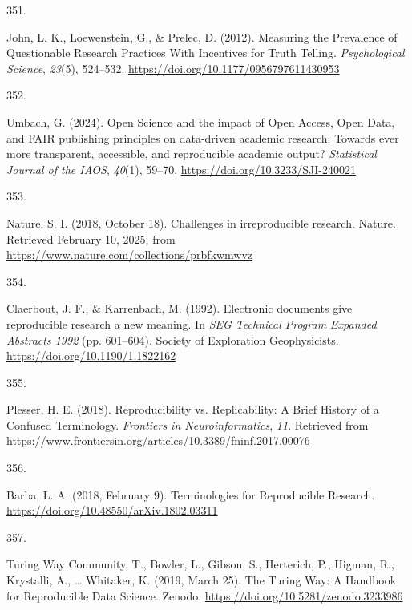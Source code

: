 \documentclass[
  11pt,
  letterpaper,
]{scrreprt}
\newlength{\cslhangindent}
\newlength{\csllabelwidth}
\newenvironment{CSLReferences}[2] %
 {\begin{list}{}{%
  \setlength{\itemindent}{0pt}
  \setlength{\leftmargin}{0pt}
  \setlength{\parsep}{0pt}
  \ifodd #1
   \setlength{\leftmargin}{\cslhangindent}
   \setlength{\itemindent}{-1\cslhangindent}
  \fi
  \setlength{\itemsep}{#2\baselineskip}}}
 {\end{list}}
\newcommand{\CSLLeftMargin}[1]{\parbox[t]{\csllabelwidth}{\strut#1\strut}}
\newcommand{\CSLRightInline}[1]{\parbox[t]{\linewidth - \csllabelwidth}{\strut#1\strut}}
\begin{document}
\begin{CSLReferences}{0}{0}
\CSLLeftMargin{351. }%
\CSLRightInline{John, L. K., Loewenstein, G., \& Prelec, D. (2012).
Measuring the {Prevalence} of {Questionable Research Practices With
Incentives} for {Truth Telling}. \emph{Psychological Science},
\emph{23}(5), 524--532. \url{https://doi.org/10.1177/0956797611430953}}

\CSLLeftMargin{352. }%
\CSLRightInline{Umbach, G. (2024). Open {Science} and the impact of
{Open Access}, {Open Data}, and {FAIR} publishing principles on
data-driven academic research: {Towards} ever more transparent,
accessible, and reproducible academic output? \emph{Statistical Journal
of the IAOS}, \emph{40}(1), 59--70.
\url{https://doi.org/10.3233/SJI-240021}}

\CSLLeftMargin{353. }%
\CSLRightInline{Nature, S. I. (2018, October 18). Challenges in
irreproducible research. Nature. Retrieved February 10, 2025, from
\url{https://www.nature.com/collections/prbfkwmwvz}}

\CSLLeftMargin{354. }%
\CSLRightInline{Claerbout, J. F., \& Karrenbach, M. (1992). Electronic
documents give reproducible research a new meaning. In \emph{{SEG
Technical Program Expanded Abstracts} 1992} (pp. 601--604). Society of
Exploration Geophysicists. \url{https://doi.org/10.1190/1.1822162}}

\CSLLeftMargin{355. }%
\CSLRightInline{Plesser, H. E. (2018). Reproducibility vs.
{Replicability}: {A Brief History} of a {Confused Terminology}.
\emph{Frontiers in Neuroinformatics}, \emph{11}. Retrieved from
\url{https://www.frontiersin.org/articles/10.3389/fninf.2017.00076}}

\CSLLeftMargin{356. }%
\CSLRightInline{Barba, L. A. (2018, February 9). Terminologies for
{Reproducible Research}.
\url{https://doi.org/10.48550/arXiv.1802.03311}}

\CSLLeftMargin{357. }%
\CSLRightInline{Turing Way Community, T., Bowler, L., Gibson, S.,
Herterich, P., Higman, R., Krystalli, A., \ldots{} Whitaker, K. (2019,
March 25). The {Turing Way}: {A Handbook} for {Reproducible Data
Science}. Zenodo. \url{https://doi.org/10.5281/zenodo.3233986}}


\end{CSLReferences}
\end{document}
